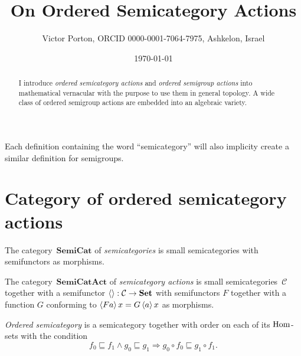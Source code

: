 \documentclass[a4paper,oneside,english,reqno]{amsart}
\begin{document}
\title{On Ordered Semicategory Actions}

\author{Victor Porton, ORCID 0000-0001-7064-7975, Ashkelon, Israel}



\date{\today}

\begin{abstract}
I introduce \emph{ordered semicategory actions} and \emph{ordered semigroup actions} into mathematical vernacular with the purpose to use them in general topology. A wide class of ordered semigroup actions are embedded into an algebraic variety.
\end{abstract}



\maketitle


Each definition containing the word ``semicategory'' will also implicity create a similar definition for semigroups.

\section{Category of ordered semicategory actions}

\begin{defn}
The category~$\mathbf{SemiCat}$ of \emph{semicategories} is small semicategories with semifunctors as morphisms.
\end{defn}

\begin{defn}
The category~$\mathbf{SemiCatAct}$ of \emph{semicategory actions} is small semicategories~$\mathcal{C}$ together with a semifunctor $\left\langle \right\rangle:\mathcal{C}\to\mathbf{Set}$ with semifunctors $F$ together with a function $G$ conforming to $\left\langle Fa\right\rangle x=G\left\langle a\right\rangle x$ as morphisms.
\end{defn}

\begin{defn}
\emph{Ordered semicategory} is a semicategory together with order on each of its $\operatorname{Hom}$-sets with the condition
\[ f_0\sqsubseteq f_1\land g_0\sqsubseteq g_1\Rightarrow g_0\circ f_0\sqsubseteq g_1\circ f_1. \]
\end{defn}
\end{document}
